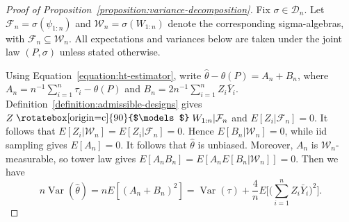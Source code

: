 \documentclass[letterpaper,12pt]{article}
\theoremstyle{definition}
\numberwithin{equation}{section}
\newcommand{\yleveli}{\bar Y_i}
\newcommand{\indep}{\mathrel{\raisebox{0.05em}{\rotatebox[origin=c]{90}{$\models$}}}}
\DeclareMathOperator{\var}{Var}
\begin{document}
\begin{proof}[Proof of Proposition~\ref{proposition:variance-decomposition}]
Fix $\sigma\in\mathcal D_n$.
Let $\mathcal F_n=\sigma(\psi_{1:n})$ and $\mathcal W_n=\sigma(W_{1:n})$ denote the corresponding sigma-algebras, with $\mathcal F_n\subseteq\mathcal W_n$.
All expectations and variances below are taken under the joint law $(P,\sigma)$ unless stated otherwise.

Using Equation~\eqref{equation:ht-estimator}, write $\widehat\theta-\theta(P)=A_n+B_n$, where $A_n=n^{-1}\sum_{i=1}^n\tau_i-\theta(P)$ and $B_n=2n^{-1}\sum_{i=1}^nZ_i\yleveli$.
Definition~\ref{definition:admissible-designs} gives $Z\indep W_{1:n}|\mathcal F_n$ and $E[Z_i|\mathcal F_n]=0$.
It follows that $E[Z_i|\mathcal W_n]=E[Z_i|\mathcal F_n]=0$.
Hence $E[B_n|\mathcal W_n]=0$, while iid sampling gives $E[A_n]=0$.
It follows that $\widehat\theta$ is unbiased.
Moreover, $A_n$ is $\mathcal W_n$-measurable, so tower law gives $E[A_nB_n]=E[A_nE[B_n|\mathcal W_n]]=0$.
Then we have
\begin{equation}\label{equation:proof-ht-variance-split}
n\var(\widehat\theta)=nE[(A_n+B_n)^2]=\var(\tau)+\frac{4}{n}E\bigg[\bigg(\sum_{i=1}^nZ_i\yleveli\bigg)^2\bigg].
\end{equation}


\end{proof}
\end{document}

